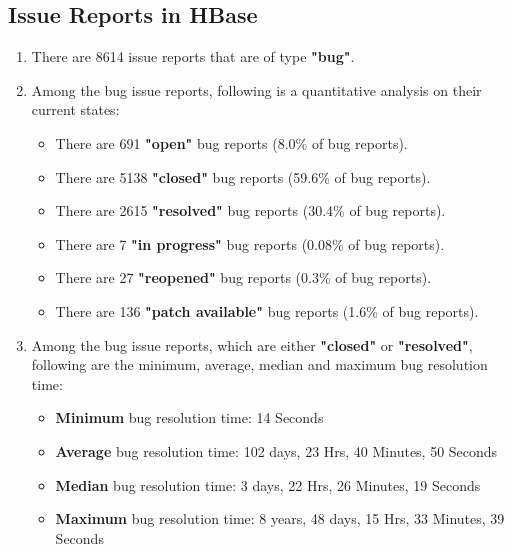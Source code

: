 \documentclass[fontsize=12pt,paper=letter,twoside]{scrartcl}
\begin{document}
\newpage
\subsection{Issue Reports in HBase}

\begin{enumerate}
\item There are 8614 issue reports that are of type \textbf{"bug"}.
\item Among the bug issue reports, following is a quantitative analysis on their current states:
\begin{itemize}
\item There are 691 \textbf{"open"} bug reports (8.0\% of bug reports).
\item There are 5138 \textbf{"closed"} bug reports (59.6\% of bug reports).
\item There are 2615 \textbf{"resolved"} bug reports (30.4\% of bug reports).
\item There are 7 \textbf{"in progress"} bug reports (0.08\% of bug reports).
\item There are 27 \textbf{"reopened"} bug reports (0.3\% of bug reports).
\item There are 136 \textbf{"patch available"} bug reports (1.6\% of bug reports).
\end{itemize}
\item Among the bug issue reports, which are either \textbf{"closed"} or \textbf{"resolved"}, following are the minimum, average, median and maximum bug resolution time:
\begin{itemize}
\item \textbf{Minimum} bug resolution time: 14 Seconds
\item \textbf{Average} bug resolution time: 102 days, 23 Hrs, 40 Minutes, 50 Seconds
\item \textbf{Median} bug resolution time: 3 days, 22 Hrs, 26 Minutes, 19 Seconds
\item \textbf{Maximum} bug resolution time: 8 years, 48 days, 15 Hrs, 33 Minutes, 39 Seconds
\end{itemize}
\end{enumerate}
\end{document}
